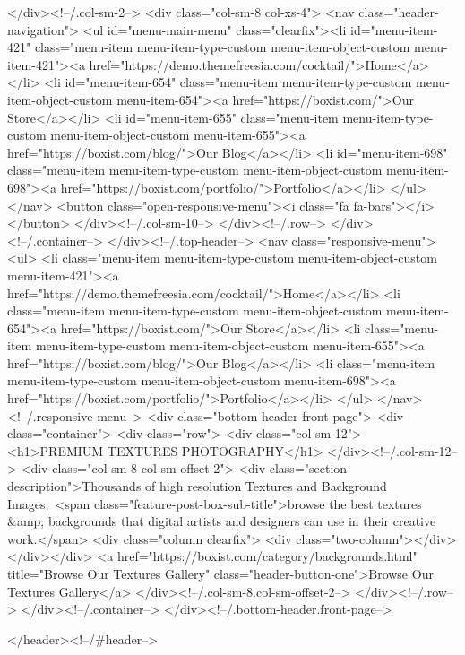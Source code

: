 				</div><!--/.col-sm-2-->
				<div class="col-sm-8 col-xs-4">
					<nav class="header-navigation">
						<ul id="menu-main-menu" class="clearfix"><li id="menu-item-421" class="menu-item menu-item-type-custom menu-item-object-custom menu-item-421"><a href="https://demo.themefreesia.com/cocktail/">Home</a></li>
<li id="menu-item-654" class="menu-item menu-item-type-custom menu-item-object-custom menu-item-654"><a href="https://boxist.com/">Our Store</a></li>
<li id="menu-item-655" class="menu-item menu-item-type-custom menu-item-object-custom menu-item-655"><a href="https://boxist.com/blog/">Our Blog</a></li>
<li id="menu-item-698" class="menu-item menu-item-type-custom menu-item-object-custom menu-item-698"><a href="https://boxist.com/portfolio/">Portfolio</a></li>
</ul>					</nav>
					<button class="open-responsive-menu"><i class="fa fa-bars"></i></button>
				</div><!--/.col-sm-10-->
			</div><!--/.row-->
		</div><!--/.container-->
	</div><!--/.top-header-->
	<nav class="responsive-menu">
		<ul>
			<li class="menu-item menu-item-type-custom menu-item-object-custom menu-item-421"><a href="https://demo.themefreesia.com/cocktail/">Home</a></li>
<li class="menu-item menu-item-type-custom menu-item-object-custom menu-item-654"><a href="https://boxist.com/">Our Store</a></li>
<li class="menu-item menu-item-type-custom menu-item-object-custom menu-item-655"><a href="https://boxist.com/blog/">Our Blog</a></li>
<li class="menu-item menu-item-type-custom menu-item-object-custom menu-item-698"><a href="https://boxist.com/portfolio/">Portfolio</a></li>
		</ul>
	</nav><!--/.responsive-menu-->
		<div class="bottom-header front-page">
		<div class="container">
			<div class="row">
									<div class="col-sm-12">
						<h1>PREMIUM TEXTURES PHOTOGRAPHY</h1>
					</div><!--/.col-sm-12-->
								<div class="col-sm-8 col-sm-offset-2">
											<div class="section-description">Thousands of high resolution Textures and Background Images, <span class="feature-post-box-sub-title">browse the best textures &amp; backgrounds that digital artists and designers can use in their creative work.</span>
<div class="column clearfix">
<div class="two-column"></div>
</div></div>
																<a href="https://boxist.com/category/backgrounds.html" title="Browse Our Textures Gallery" class="header-button-one">Browse Our Textures Gallery</a>
														</div><!--/.col-sm-8.col-sm-offset-2-->
			</div><!--/.row-->
		</div><!--/.container-->
	</div><!--/.bottom-header.front-page-->

</header><!--/#header-->


